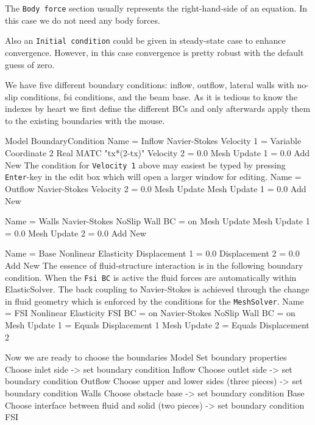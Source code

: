 The \texttt{Body force} section usually represents the right-hand-side of an equation. 
In this case we do not need any body forces.

Also an \texttt{Initial condition} could be given in steady-state case to enhance convergence. However, 
in this case convergence is pretty robust with the default guess of zero.

We have five different boundary conditions: inflow, outflow, lateral walls with no-slip conditions, 
fsi conditions, and the beam base. 
As it is tedious to know the indexes by heart we 
first define the different BCs and only afterwards apply them to the existing boundaries 
with the mouse. 

\ttbegin
Model
  BoundaryCondition
    Name = Inflow
    Navier-Stokes 
      Velocity 1 = Variable Coordinate 2 
        Real MATC "tx*(2-tx)"
      Velocity 2 = 0.0
      Mesh Update 1 = 0.0
    Add
    New
\ttend
The condition for \texttt{Velocity 1} above may easiest be typed by pressing \texttt{Enter}-key in the
edit box which will open a larger window for editing.
\ttbegin
    Name = Outflow
    Navier-Stokes 
      Velocity 2 = 0.0
    Mesh Update
      Mesh Update 1 = 0.0
    Add
    New

    Name = Walls
    Navier-Stokes 
      NoSlip Wall BC = on
    Mesh Update
      Mesh Update 1 = 0.0
      Mesh Update 2 = 0.0
    Add 
    New
 
    Name = Base
    Nonlinear Elasticity
      Displacement 1 = 0.0
      Displacement 2 = 0.0
    Add
    New
\ttend
The essence of fluid-structure interaction is in the following boundary condition. 
When the \texttt{Fsi BC} is active the fluid forces are automatically within ElasticSolver.
The back coupling to Navier-Stokes is achieved through the change in fluid geometry which is enforced
by the conditions for the \texttt{MeshSolver}.
\ttbegin
    Name = FSI 
    Nonlinear Elasticity 
      FSI BC = on
    Navier-Stokes 
      NoSlip Wall BC = on
    Mesh Update 1 = Equals Displacement 1
    Mesh Update 2 = Equals Displacement 2
\ttend   

Now we are ready to choose the boundaries 
\ttbegin
Model
  Set boundary properties
    Choose inlet side -> set boundary condition Inflow
    Choose outlet side -> set boundary condition Outflow
    Choose upper and lower sides (three pieces) -> set boundary condition Walls
    Choose obstacle base -> set boundary condition Base
    Choose interface between fluid and solid (two pieces) -> set boundary condition FSI
\ttend

